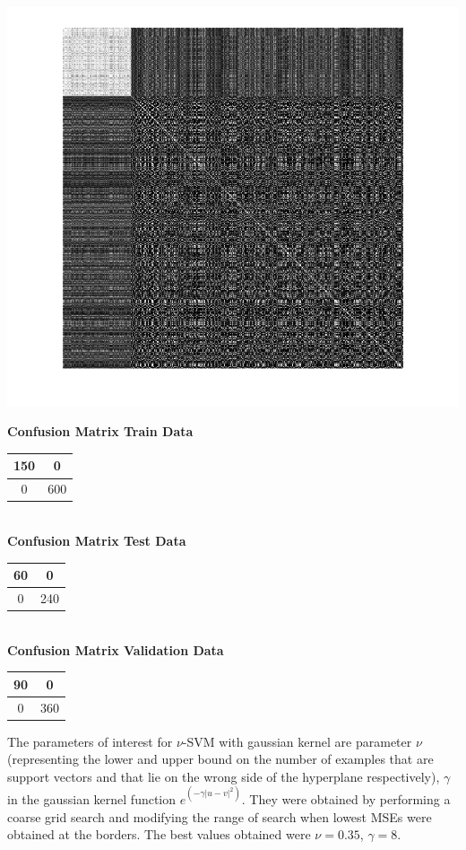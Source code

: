 \documentclass{article}
\begin{document}
\begin{center}
\includegraphics[scale=0.6]{Classification/1b/nu_g/kgm}
\end{center}


\begin{flushleft}
\textbf{Confusion Matrix Train Data\\[5pt]}
\begin{tabular}{|c|c|}
\hline
150 & 0 \\
\hline
0 & 600\\
\hline
\end{tabular}
\textbf{\\[10pt] Confusion Matrix Test Data \\[5pt]}
\begin{tabular}{|c|c|}
\hline
60 & 0 \\
\hline
0 & 240\\
\hline
\end{tabular}
\textbf{\\[10pt] Confusion Matrix Validation Data \\[5pt]}
\begin{tabular}{|c|c|}
\hline
90 & 0 \\
\hline
0 & 360\\
\hline
\end{tabular}
\end{flushleft}



The parameters of interest for $\nu$-SVM with gaussian kernel are parameter $\nu$(representing the lower and upper bound on the number of examples that are support vectors and that lie on the wrong side of the hyperplane respectively), $\gamma$ in the gaussian kernel function $e^{(-\gamma|u-v|^{2})}$. They were obtained by performing a coarse grid search and modifying the range of search when lowest MSEs were obtained at the borders.
The best values obtained were $\nu=0.35$, $\gamma=8$.
\end{document}
